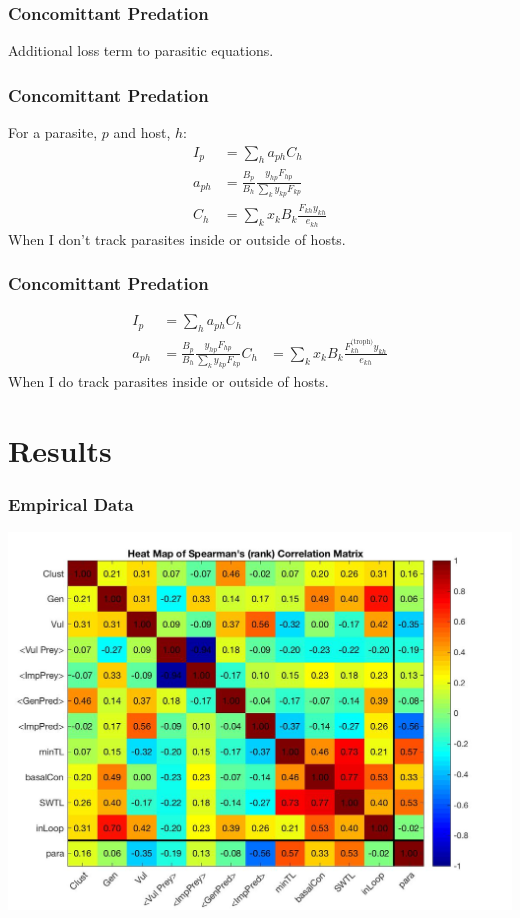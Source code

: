 \documentclass{beamer}
\begin{document}
\begin{frame}
\frametitle{Concomittant Predation}


Additional loss term to parasitic equations.

\end{frame}

\begin{frame}
\frametitle{Concomittant Predation}
For a parasite, $p$ and host, $h$:
\begin{align*}
I_p & = \sum_h a_{ph}C_h\\
a_{ph}& = \frac{B_p}{B_h}\frac{y_{hp}F_{hp}}{\sum_{k}y_{kp}F_{kp}}\\ 
C_h &= \sum_kx_kB_k\frac{F_{kh}y_{kh}}{e_{kh}} 
\end{align*}
When I don't track parasites inside or outside of hosts. 
\end{frame}

\begin{frame}
\frametitle{Concomittant Predation}
\begin{align*}
I_p & = \sum_h a_{ph}C_h\\
a_{ph} &= \frac{B_p}{B_h}\frac{y_{hp}F_{hp}}{\sum_{k}y_{kp}F_{kp}} \label{aph2}
C_h &= \sum_kx_kB_k\frac{F^\text{(troph)}_{kh}y_{kh}}{e_{kh}} 
\end{align*}
When I do track parasites inside or outside of hosts.
\end{frame}

\section{Results}

\begin{frame}
\frametitle{Empirical Data}
\includegraphics[width = \linewidth]{corMapSpear.jpg}

\end{frame}
\end{document}
